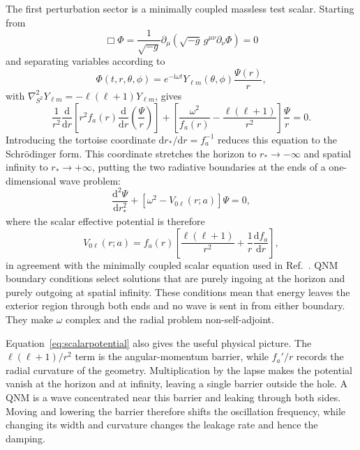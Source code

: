 \documentclass[12pt,a4paper]{article}
\newcommand{\dd}{\mathrm{d}}
\newcommand{\ii}{\mathrm{i}}
\begin{document}
The first perturbation sector is a minimally coupled massless test scalar.
Starting from
\begin{equation}
\Box\Phi=\frac{1}{\sqrt{-g}}\partial_\mu
\left(\sqrt{-g}\,g^{\mu\nu}\partial_\nu\Phi\right)=0
\label{eq:kleingordon}
\end{equation}
and separating variables according to
\begin{equation}
\Phi(t,r,\theta,\phi)=e^{-\ii\omega t}Y_{\ell m}(\theta,\phi)
\frac{\Psi(r)}{r},
\label{eq:scalarseparation}
\end{equation}
with \(\nabla^2_{S^2}Y_{\ell m}=-\ell(\ell+1)Y_{\ell m}\), gives
\begin{equation}
\frac{1}{r^2}\frac{\dd}{\dd r}
\left[r^2 f_a(r)\frac{\dd}{\dd r}\left(\frac{\Psi}{r}\right)\right]
+\left[\frac{\omega^2}{f_a(r)}-\frac{\ell(\ell+1)}{r^2}\right]
\frac{\Psi}{r}=0.
\label{eq:scalarintermediate}
\end{equation}
Introducing the tortoise coordinate \(\dd r_*/\dd r=f_a^{-1}\) reduces this
equation to the Schr\"odinger form.  This coordinate stretches the horizon to
\(r_*\to-\infty\) and spatial infinity to \(r_*\to+\infty\), putting the two
radiative boundaries at the ends of a one-dimensional wave problem:
\begin{equation}
\frac{\dd^2\Psi}{\dd r_*^2}+
\left[\omega^2 - V_{0\ell}(r;a)\right]\Psi=0,
\label{eq:qnmwave}
\end{equation}
where the scalar effective potential is therefore
\begin{equation}
V_{0\ell}(r;a)=f_a(r)\left[\frac{\ell(\ell+1)}{r^2}+\frac{1}{r}\frac{\dd f_a}{\dd r}\right],
\label{eq:scalarpotential}
\end{equation}
in agreement with the minimally coupled scalar equation used in
Ref.~\cite{Konoplya2020}.  QNM boundary conditions select solutions that are
purely ingoing at the horizon and purely outgoing at spatial infinity.  These
conditions mean that energy leaves the exterior region through both ends and
no wave is sent in from either boundary.  They make \(\omega\) complex and the
radial problem non-self-adjoint.

Equation~\eqref{eq:scalarpotential} also gives the useful physical picture.
The \(\ell(\ell+1)/r^2\) term is the angular-momentum barrier, while
\(f_a'/r\) records the radial curvature of the geometry.  Multiplication by
the lapse makes the potential vanish at the horizon and at infinity, leaving a
single barrier outside the hole.  A QNM is a wave concentrated near this
barrier and leaking through both sides.  Moving and lowering the barrier
therefore shifts the oscillation frequency, while changing its width and
curvature changes the leakage rate and hence the damping.
\end{document}
